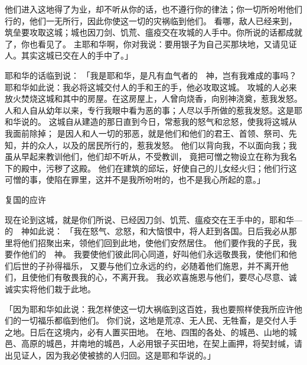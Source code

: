 {他们进入这地得了为业，却不听从你的话，也不遵行你的律法；你一切所吩咐他们行的，他们一无所行，因此你使这一切的灾祸临到他们。
看哪，敌人已经来到，筑垒要攻取这城；城也因刀剑、饥荒、瘟疫交在攻城的{}人手中。你所说的话都成就了，你也看见了。
主耶和华啊，你对我说：要用银子为自己买那块地，又请见证人。其实这城已交在{}人的手中了。」
\par }{\PP {}耶和华的话临到{}说：
「我是耶和华，是凡有血气者的　神，岂有我难成的事吗？
耶和华如此说：我必将这城交付{}人的手和{}王{}的手，他必攻取这城。
攻城的{}人必来放火焚烧这城和其中的房屋。在这房屋上，人曾向{}烧香，向别神浇奠，惹我发怒。
人和{}人自从幼年以来，专行我眼中看为恶的事；{}人尽以手所做的惹我发怒。这是耶和华说的。
这城自从建造的那日直到今日，常惹我的怒气和忿怒，使我将这城从我面前除掉；
是因{}人和{}人一切的邪恶，就是他们和他们的君王、首领、祭司、先知，并{}的众人，以及{}的居民所行的，惹我发怒。
他们以背向我，不以面向我；我虽从早起来教训他们，他们却不听从，不受教训，
竟把可憎之物设立在称为我名下的殿中，污秽了这殿。
他们在{}建筑{}的邱坛，好使自己的儿女经火归{}；他们行这可憎的事，使{}陷在罪里，这并不是我所吩咐的，也不是我心所起的意。」
\par }{\SH 复国的应许
\par }{\PP {}现在论到这城，就是你们所说、已经因刀剑、饥荒、瘟疫交在{}王手中的，耶和华—{}的　神如此说：
「我在怒气、忿怒，和大恼恨中，将{}人赶到各国。日后我必从那里将他们招聚出来，领他们回到此地，使他们安然居住。
他们要作我的子民，我要作他们的　神。
我要使他们彼此同心同道，好叫他们永远敬畏我，使他们和他们后世的子孙得福乐，
又要与他们立永远的约，必随着他们施恩，并不离开他们，且使他们有敬畏我的心，不离开我。
我必欢喜施恩与他们，要尽心尽意、诚诚实实将他们栽于此地。
\par }{\PP {}「因为耶和华如此说：我怎样使这一切大祸临到这百姓，我也要照样使我所应许他们的一切福乐都临到他们。
你们说，这地是荒凉、无人民、无牲畜，是交付{}人手之地。日后在这境内，必有人置买田地。
在{}地、{}四围的各处、{}的城邑、山地的城邑、高原的城邑，并南地的城邑，人必用银子买田地，在契上画押，将契封缄，请出见证人，因为我必使被掳的人归回。这是耶和华说的。」

}
